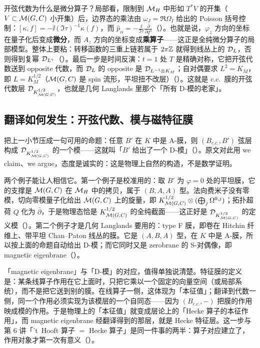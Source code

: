 开弦代数为什么是微分算子？局部看，限制到 $\mathcal{M}_{H}$ 中形如 $T^*V$ 的开集（$V\subset\mathcal{M}(G,C)$ 小开集）后，边界态的乘法由 $\omega_J=\Re\Omega_I$ 给出的 Poisson 括号控制：$[\kappa,f]=-\ii(\Im\tau)^{-1}\kappa(f)$，而 $\hat p_\alpha=-\frac{\ii}{\Im\tau}\frac{\partial}{\partial q^\alpha}$（）。也就是说，$\varphi_z$ 方向的坐标在量子化后变成\textbf{微分}，而 $A_z$ 方向的坐标变成\textbf{乘算子}——这正是全纯微分算子的局部模型。整体上要粘：转移函数的三重上链若属于 $2\pi\mathbb{Z}$ 就得到线丛上的 $\mathcal{D}_L$，否则得到复幂 $\mathcal{D}_{L^\gamma}$（）。最后一步是时间反演：$t=1$ 处 $T$ 是精确对称，它把开弦代数送到 opposite 代数，而 $\mathcal{D}_L$ 的 opposite 是 $\mathcal{D}_{L^{-1}\otimes K_M}$；自对偶要求 $L^2=K_M$，即 $L=K_M^{1/2}$（$\mathcal{M}(G,C)$ 是 spin 流形，平坦扭不改层）（）。这就是 c.c.\ 膜的开弦代数层 $\mathcal{D}_{K_{\mathcal{M}(G,C)}^{1/2}}$，也就是几何 Langlands 里那个「所有 D-模的老家」。

\subsection{翻译如何发生：开弦代数、模与磁特征膜}

把上一小节压成一句可用的命题：任意 $B'$ 在 $K$ 中是 A-膜，则 $(B_{c.c.},B')$ 弦层构成 $\mathcal{D}_{K_{\mathcal{M}(G,C)}^{1/2}}$ 的一个模——这就叫「$B'$ 给出了一个 D-模」（）。原文对此用 we claim、we argue，态度是诚实的：这是物理上自然的构造，不是数学证明。

两个例子能让人相信它。第一个例子是校准用的：取 $B'$ 为 $\varphi=0$ 处的平坦膜，它的支撑是 $\mathcal{M}(G,C)$ 在 $\mathcal{M}_{H}$ 中的拷贝，属于 $(B,A,A)$ 型。法向费米子没有零模，切向零模量子化给出 $\mathcal{M}(G,C)$ 上的旋量，即 $K_{\mathcal{M}(G,C)}^{1/2}\otimes(\bigoplus_j\Omega^{0,j})$；拓扑超荷 $Q$ 化为 $\bar\partial$，于是物理态恰是 $K_{\mathcal{M}(G,C)}^{1/2}$ 的全纯截面——这正好是 $\mathcal{D}_{K_{\mathcal{M}(G,C)}^{1/2}}$ 的定义模（）。第二个例子才是几何 Langlands 要用的：type F 膜，即卷在 Hitchin 纤维上、带平坦 Chan--Paton 线丛的膜。它是 $(A,B,A)$ 型，在 $K$ 中是 A-膜，所以按上面的命题自动给出 D-模；而它同时又是 zerobrane 的 S-对偶像，即 magnetic eigenbrane（）。

「magnetic eigenbrane」与「D-模」的对应，值得单独说清楚。特征膜的定义是：某条线算子作用在它上面时，只把它乘以一个固定的向量空间（或局部系统），而不是把它送到别的膜。在线算子一侧，这体现为「本征值」；翻译到代数一侧，同一个作用必须实现为该模层的一个自同态——因为 $(B_{c.c.},-)$ 把膜的作用映成模的作用。于是物理上的「本征值」就变成层论上的「Hecke 算子的本征作用」，而 magnetic eigenbrane 经翻译得到的那层，就是 Hecke 特征层。这一步与第 6 讲「't~Hooft 算子 $=$ Hecke 算子」是同一件事的两半：算子对应建立了，作用对象才第一次有意义（）。

